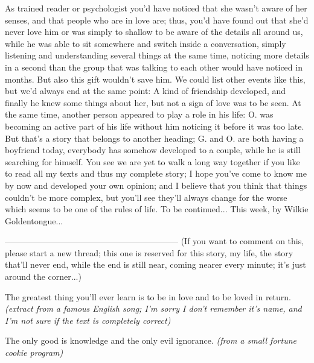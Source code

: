 As trained reader or psychologist you'd have noticed that she wasn't aware of her senses, and that people who are in love are; thus, you'd have found out that she'd never love him or was simply to shallow to be aware of the details all around us, while he was able to sit somewhere and switch inside a conversation, simply listening and understanding several things at the same time, noticing more details in a second than the group that was talking to each other would have noticed in months. 
But also this gift wouldn't save him. 
We could list other events like this, but we'd always end at the same point: A kind of friendship developed, and finally he knew some things about her, but not a sign of love was to be seen. At the same time, another person appeared to play a role in his life: O. was becoming an active part of his life without him noticing it before it was too late. 
But that's a story that belongs to another heading; G. and O. are both having a boyfriend today, everybody has somehow developed to a couple, while he is still searching for himself. You see we are yet to walk a long way together if you like to read all my texts and thus my complete story; I hope you've come to know me by now and developed your own opinion; and I believe that you think that things couldn't be more complex, but you'll see they'll always change for the worse which seems to be one of the rules of life. 
To be continued...
This week, by Wilkie Goldentongue...

--------------------------------------------------------------
(If you want to comment on this, please start a new thread; this one is reserved for this story, my life, the story that'll never end, while the end is still near, coming nearer every minute; it's just around the corner...)

The greatest thing
you'll ever learn
is to be in love
and to be loved
in return. 
\emph{(extract from a famous English song; I'm sorry I don't remember it's name, and I'm not sure if the text is completely correct)}

The only good is knowledge and the only evil ignorance. 
\emph{(from a small fortune cookie program)}
